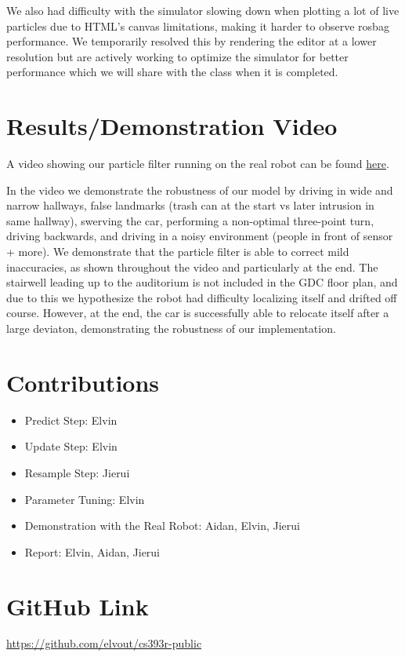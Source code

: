 \documentclass[11pt]{article}
\begin{document}
We also had difficulty with the simulator slowing down when plotting a lot of
live particles due to HTML's canvas limitations, making it harder to observe
rosbag performance. We temporarily resolved this by rendering the editor at a
lower resolution but are actively working to optimize the simulator for better
performance which we will share with the class when it is completed.

\section{Results/Demonstration Video}

A video showing our particle filter running on the real robot can be found
\href{https://drive.google.com/file/d/1xbL8haRyl_F6Kn7htrOQPeWww6VWr7wj/view?usp=sharing}{here}.

In the video we demonstrate the robustness of our model by driving in wide and
narrow hallways, false landmarks (trash can at the start vs later intrusion in
same hallway), swerving the car, performing a non-optimal three-point turn,
driving backwards, and driving in a noisy environment (people in front of sensor
+ more). We demonstrate that the particle filter is able to correct mild
inaccuracies, as shown throughout the video and particularly at the end. The
stairwell leading up to the auditorium is not included in the GDC floor plan,
and due to this we hypothesize the robot had difficulty localizing itself and
drifted off course. However, at the end, the car is successfully able to
relocate itself after a large deviaton, demonstrating the robustness of our
implementation.

\section{Contributions}

\begin{itemize}
    \setlength\itemsep{0pt}
    \item Predict Step: Elvin
    \item Update Step: Elvin
    \item Resample Step: Jierui
    \item Parameter Tuning: Elvin
    \item Demonstration with the Real Robot: Aidan, Elvin, Jierui
    \item Report: Elvin, Aidan, Jierui
\end{itemize}

\section{GitHub Link}

\href{https://github.com/elvout/cs393r-public}{https://github.com/elvout/cs393r-public}
\end{document}
